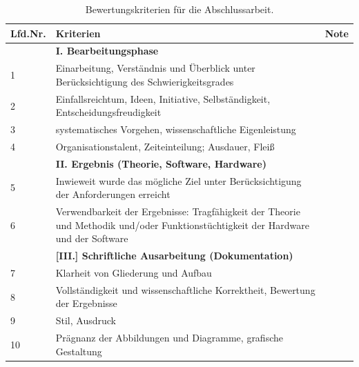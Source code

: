 \begin{table}[!ph]
\centering
\begin{tabular}{ |p{1cm}|p{10cm}|p{0.7cm}|  }
\hline
Lfd.Nr. & Kriterien  & Note\\  
\hline
\hline
&\textbf{I. Bearbeitungsphase}&\\
\hline
1&Einarbeitung, Verständnis und Überblick unter Berücksichtigung des Schwierigkeitsgrades&\\
\hline
2& Einfallsreichtum, Ideen, Initiative, Selbständigkeit, Entscheidungsfreudigkeit&\\
\hline
3& systematisches Vorgehen, wissenschaftliche Eigenleistung&\\
\hline
4&Organisationstalent, Zeiteinteilung; Ausdauer, Fleiß&\\
\hline
& \textbf{II. Ergebnis (Theorie, Software, Hardware)}&\\ 
\hline
5&Inwieweit wurde das mögliche Ziel unter Berücksichtigung der Anforderungen erreicht&\\
\hline
6&Verwendbarkeit der Ergebnisse: Tragfähigkeit der Theorie und Methodik und/oder Funktionstüchtigkeit der Hardware und der Software&\\
\hline
&\textbf{[III.] Schriftliche Ausarbeitung (Dokumentation)}&\\
\hline
7&Klarheit von Gliederung und Aufbau&\\
\hline
8&Vollständigkeit und wissenschaftliche Korrektheit, Bewertung der Ergebnisse&\\
\hline
9&Stil, Ausdruck&\\\hline
10&Prägnanz der Abbildungen und Diagramme, grafische Gestaltung&\\
\hline
\end{tabular}
\caption{Bewertungskriterien für die Abschlussarbeit.}
\label{tab:arbeit}
\end{table}


